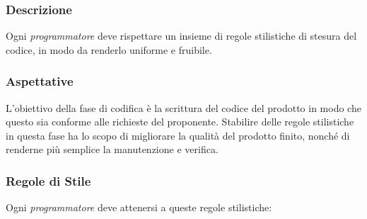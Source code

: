 \subsubsection{Descrizione}
Ogni \textit{programmatore} deve rispettare un insieme di regole stilistiche di stesura del codice, in modo da renderlo uniforme e fruibile.
\subsubsection{Aspettative}
L'obiettivo della fase di codifica è la scrittura del codice del prodotto in modo che questo sia conforme alle richieste del proponente.
Stabilire delle regole stilistiche in questa fase ha lo scopo di migliorare la qualità del prodotto finito, nonché di renderne più semplice la manutenzione e verifica.
\subsubsection{Regole di Stile}
Ogni \textit{programmatore} deve attenersi a queste regole stilistiche:

